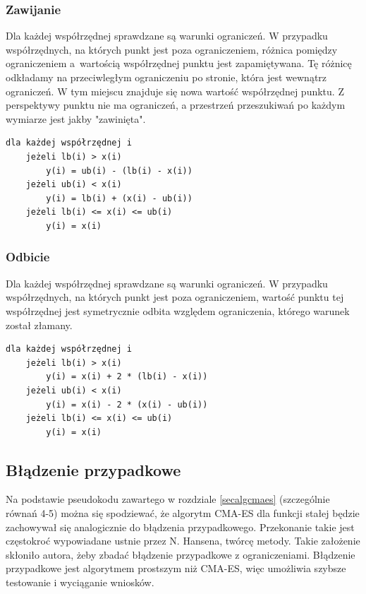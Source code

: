 \documentclass{mini}
\begin{document}
\subsubsection{Zawijanie}
\hspace{3,4ex}Dla każdej współrzędnej sprawdzane są warunki ograniczeń. W przypadku współrzędnych, na których punkt jest poza ograniczeniem, różnica pomiędzy ograniczeniem a~wartością współrzędnej punktu jest zapamiętywana. Tę różnicę odkładamy na przeciwległym ograniczeniu po stronie, która jest wewnątrz ograniczeń. W tym miejscu znajduje się nowa wartość współrzędnej punktu. Z perspektywy punktu nie ma ograniczeń, a przestrzeń przeszukiwań po każdym wymiarze jest jakby "zawinięta".

\begin{Verbatim}[baselinestretch=1.1]
dla każdej współrzędnej i
	jeżeli lb(i) > x(i)
		y(i) = ub(i) - (lb(i) - x(i))
	jeżeli ub(i) < x(i)
		y(i) = lb(i) + (x(i) - ub(i))
	jeżeli lb(i) <= x(i) <= ub(i)
		y(i) = x(i)
\end{Verbatim}

\subsubsection{Odbicie}
\hspace{3,4ex}Dla każdej współrzędnej sprawdzane są warunki ograniczeń. W przypadku współrzędnych, na których punkt jest poza ograniczeniem, wartość punktu tej współrzędnej jest symetrycznie odbita względem ograniczenia, którego warunek został złamany.

\begin{Verbatim}[baselinestretch=1.1]
dla każdej współrzędnej i
	jeżeli lb(i) > x(i)
		y(i) = x(i) + 2 * (lb(i) - x(i))
	jeżeli ub(i) < x(i)
		y(i) = x(i) - 2 * (x(i) - ub(i))
	jeżeli lb(i) <= x(i) <= ub(i)
		y(i) = x(i)
\end{Verbatim}

\subsection{Błądzenie przypadkowe} \label{bladzenie}
\hspace{3,4ex}Na podstawie pseudokodu zawartego w rozdziale \ref{secalgcmaes} (szczególnie równań 4-5) można się spodziewać, że algorytm CMA-ES dla funkcji stałej będzie zachowywał się analogicznie do błądzenia przypadkowego. Przekonanie takie jest częstokroć wypowiadane ustnie przez N. Hansena, twórcę metody. Takie założenie skłoniło autora, żeby zbadać błądzenie przypadkowe z ograniczeniami. Błądzenie przypadkowe jest algorytmem prostszym niż CMA-ES, więc umożliwia szybsze testowanie i wyciąganie wniosków.
\end{document}
